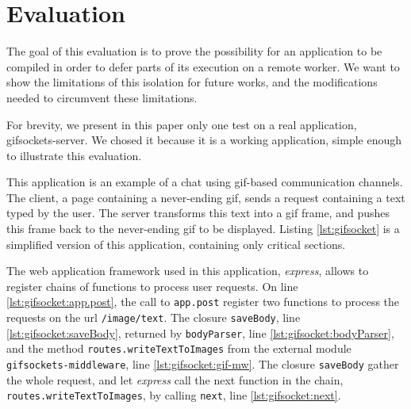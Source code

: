 \section{Evaluation} \label{section:evaluation}

The goal of this evaluation is to prove the possibility for an application to be compiled in order to defer parts of its execution on a remote worker.
We want to show the limitations of this isolation for future works, and the modifications needed to circumvent these limitations.

For brevity, we present in this paper only one test on a real application, gifsockets-server.
We chosed it because it is a working application, simple enough to illustrate this evaluation.

This application is an example of a chat using gif-based communication channels.
The client, a page containing a never-ending gif, sends a request containing a text typed by the user.
The server transforms this text into a gif frame, and pushes this frame back to the never-ending gif to be displayed.
Listing \ref{lst:gifsocket} is a simplified version of this application, containing only critical sections.

The web application framework used in this application, \textit{express}, allows to register chains of functions to process user requests.
On line \ref{lst:gifsocket:app.post}, the call to \texttt{app.post} register two functions to process the requests on the url \texttt{/image/text}.
The closure \texttt{saveBody}, line \ref{lst:gifsocket:saveBody}, returned by \texttt{bodyParser}, line \ref{lst:gifsocket:bodyParser}, and the method \texttt{routes.write\-Text\-To\-Images} from the external module \texttt{gifsockets-middleware}, line \ref{lst:gifsocket:gif-mw}.
The closure \texttt{saveBody} gather the whole request, and let \textit{express} call the next function in the chain, \texttt{routes.write\-Text\-To\-Images}, by calling \texttt{next}, line \ref{lst:gifsocket:next}.

